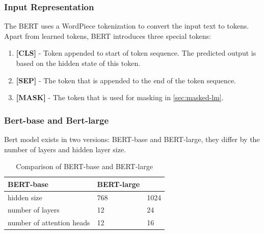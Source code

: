 \subsubsection{Input Representation}
The BERT uses a WordPiece tokenization \cite{wuGoogleNeuralMachine2016} to convert the input text to tokens.
Apart from learned tokens, BERT introduces three special tokens:
\begin{enumerate}
    \item \textbf{[CLS]} - Token appended to start of token sequence. The predicted output is based on the hidden state of this token.
    \item \textbf{[SEP]} - The token that is appended to the end of the token sequence.
    \item \textbf{[MASK]} - The token that is used for masking in \autoref{sec:masked-lm}.
\end{enumerate}


\subsubsection{Bert-base and Bert-large}
Bert model exists in two versions: BERT-base and BERT-large, they differ by the number of layers and hidden layer size.
\begin{table}[h]
    \centering\footnotesize\sf
    \begin{tabular}{lll}
        \toprule
        {} BERT-base & BERT-large \\
        \midrule
        hidden size & 768 & 1024 \\
        number of layers & 12 & 24 \\
        number of attention heads & 12 & 16 \\
        \bottomrule
    \end{tabular}
    \caption{Comparison of BERT-base and BERT-large}
    \label{tab:bert-base-large}
\end{table}


